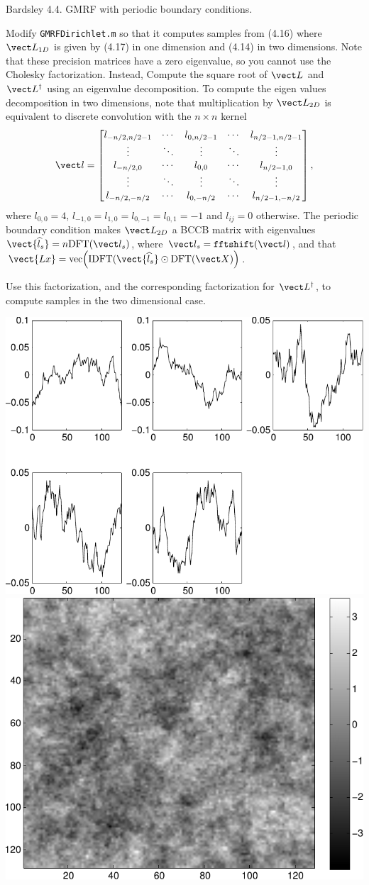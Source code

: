 \documentclass{homework}
\begin{document}
\begin{longproblem}
  Bardsley 4.4. GMRF with periodic boundary conditions.

  Modify \texttt{GMRFDirichlet.m} so that it computes samples from
  (4.16) where $\vect L_{1D}$ is given by (4.17) in one dimension
  and (4.14) in two dimensions.  Note that these precision matrices
  have a zero eigenvalue, so you cannot use the Cholesky
  factorization.  Instead, Compute the square root of $\vect L$ and $\vect
  L^\dagger$ using an eigenvalue decomposition.  To compute the eigen values decomposition in two dimensions, note that multiplication by $\vect L_{2D}$ is equivalent to discrete convolution with the $n\times n$ kernel
  $$
    \vect l = \begin{bmatrix}
      l_{-n/2,n/2-1} & \cdots & l_{0,n/2-1} & \cdots & l_{n/2-1,n/2-1} \\
      \vdots & \ddots & \vdots & \ddots & \vdots \\
      l_{-n/2,0} & \cdots & l_{0,0} & \cdots & l_{n/2-1,0} \\
      \vdots & \ddots & \vdots & \ddots & \vdots \\
      l_{-n/2,-n/2} & \cdots & l_{0,-n/2} & \cdots & l_{n/2-1,-n/2} \\
    \end{bmatrix},
  $$
  where $l_{0,0} = 4$, $l_{-1,0} =l_{1,0} =l_{0,-1} =l_{0,1} = -1$
  and $l_{ij} = 0$ otherwise.  The periodic boundary condition makes
  $\vect L_{2D}$ a BCCB matrix with eigenvalues $\vect{\hat l_s} = n \mathrm{DFT}(\vect l_s)$, where $\vect l_s = \texttt{fftshift}(\vect l)$, and that 
  $ \vect{Lx} = \mathrm{vec} \Big(\mathrm{IDFT}(\vect{\hat l_s} \odot \mathrm{DFT}(\vect X)\Big)
  $.

  Use this factorization, and the corresponding factorization for $\vect L^\dagger$, to compute samples in the two dimensional case.
\end{longproblem}

\includegraphics[width=.5\textwidth]{period_samps.pdf}
\includegraphics[width=.5\textwidth]{2dperiod_samps.pdf}
\end{document}
